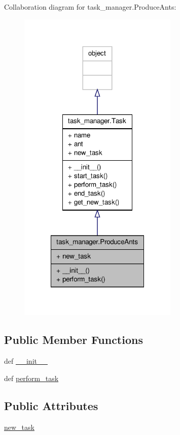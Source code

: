 Collaboration diagram for task\+\_\+manager.\+Produce\+Ants\+:
\nopagebreak
\begin{figure}[H]
\begin{center}
\leavevmode
\includegraphics[width=216pt]{classtask__manager_1_1ProduceAnts__coll__graph}
\end{center}
\end{figure}
\subsection*{Public Member Functions}
\begin{DoxyCompactItemize}
\item 
def \hyperlink{classtask__manager_1_1ProduceAnts_ab154b2db66b66e0fc43d3ef5094bf73e}{\+\_\+\+\_\+init\+\_\+\+\_\+}
\item 
def \hyperlink{classtask__manager_1_1ProduceAnts_aa1636ae28589d29d45d83dd71b2dccbb}{perform\+\_\+task}
\end{DoxyCompactItemize}
\subsection*{Public Attributes}
\begin{DoxyCompactItemize}
\item 
\hyperlink{classtask__manager_1_1ProduceAnts_a52f38a28435526dc06a11cd23916ee4b}{new\+\_\+task}
\end{DoxyCompactItemize}


